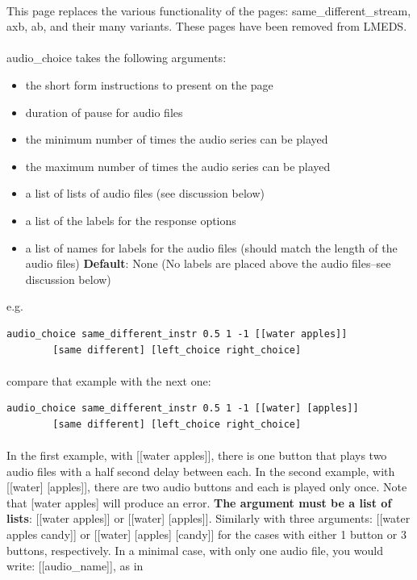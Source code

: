 \documentclass[12pt, oneside]{scrbook}   	%
\begin{document}
\paragraph{}
This page replaces the various functionality of the pages: same\_different\_stream, axb, ab, and their many variants.  These pages have been removed from LMEDS.

\paragraph{}
audio\_choice takes the following arguments:

\begin{itemize}
\item the short form instructions to present on the page
\item duration of pause for audio files
\item the minimum number of times the audio series can be played
\item the maximum number of times the audio series can be played
\item a list of lists of audio files (see discussion below)
\item a list of the labels for the response options
\item a list of names for labels for the audio files (should match the length of the audio files) \textbf{Default}: None (No labels are placed above the audio files--see discussion below)
\end{itemize}

e.g.
\begin{lstlisting}
audio_choice same_different_instr 0.5 1 -1 [[water apples]]
		[same different] [left_choice right_choice]
\end{lstlisting}

\paragraph{}
compare that example with the next one:

\begin{lstlisting}
audio_choice same_different_instr 0.5 1 -1 [[water] [apples]]
		[same different] [left_choice right_choice]
\end{lstlisting}

\paragraph{}
In the first example, with [[water apples]], there is one button that plays two audio files with a half second delay between each.  In the second example, with [[water] [apples]], there are two audio buttons and each is played only once.  Note that [water apples] will produce an error.  \textbf{The argument must be a list of lists}: [[water apples]] or [[water] [apples]].  Similarly with three arguments: [[water apples candy]] or [[water] [apples] [candy]] for the cases with either 1 button or 3 buttons, respectively.  In a minimal case, with only one audio file, you would write: [[audio\_name]], as in 
\end{document}
